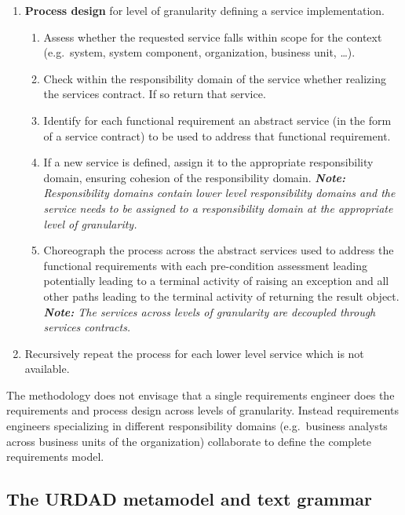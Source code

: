 \begin{enumerate}
 \item {\bf Process design} for level of granularity defining a service implementation.
      \begin{enumerate}
	\item Assess whether the requested service falls within scope for the context (e.g.\ system, system component, organization, business unit, \dots).
	\item Check within the responsibility domain of the service whether realizing the services contract. If so return that service.
        \item Identify for each functional requirement an abstract service (in the form of a service contract) to be used to address that functional requirement.
	\item If a new service is defined, assign it to the appropriate responsibility domain, ensuring cohesion of the responsibility domain. \emph{\textbf{\textit{Note:}} Responsibility domains contain lower level responsibility domains and the service needs to be assigned to a responsibility domain at the appropriate level of granularity.}
	\item Choreograph the process across the abstract services used to address the functional requirements with each pre-condition assessment leading potentially leading to a terminal activity of raising an exception and all other paths leading to the terminal activity of returning the result object. \emph{\textbf{\textit{Note:}} The services across levels of granularity are decoupled through services contracts.}
      \end{enumerate}

  \item Recursively repeat the process for each lower level service which is not available.
\end{enumerate}


The methodology does not envisage that a single requirements engineer does the requirements and process design across levels of granularity. Instead requirements engineers specializing in different responsibility domains (e.g.\ business analysts across business units of the organization) collaborate to define the complete requirements model.


\subsection{The URDAD metamodel and text grammar}
\label{sec:urdadDsl}

